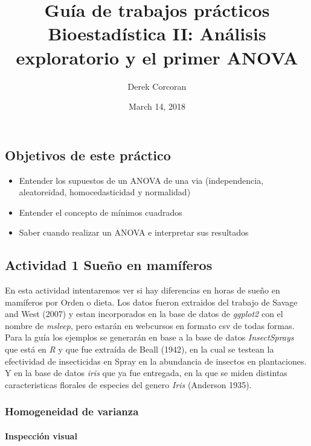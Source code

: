 \documentclass[]{article}
\title{Guía de trabajos prácticos Bioestadística II: Análisis exploratorio y el
primer ANOVA}
\author{Derek Corcoran}
\date{March 14, 2018}
\providecommand{\tightlist}{%
  \setlength{\itemsep}{0pt}\setlength{\parskip}{0pt}}
\let\oldparagraph\paragraph
\renewcommand{\paragraph}[1]{\oldparagraph{#1}\mbox{}}
\begin{document}
\maketitle

{
\setcounter{tocdepth}{2}
\tableofcontents
}
\subsection{Objetivos de este
práctico}\label{objetivos-de-este-practico}

\begin{itemize}
\tightlist
\item
  Entender los supuestos de un ANOVA de una via (independencia,
  aleatoreidad, homocedasticidad y normalidad)
\item
  Entender el concepto de mínimos cuadrados
\item
  Saber cuando realizar un ANOVA e interpretar sus resultados
\end{itemize}

\subsection{Actividad 1 Sueño en
mamíferos}\label{actividad-1-sueno-en-mamiferos}

En esta actividad intentaremos ver si hay diferencias en horas de sueño
en mamíferos por Orden o dieta. Los datos fueron extraidos del trabajo
de Savage and West (2007) y estan incorporados en la base de datos de
\emph{ggplot2} con el nombre de \emph{msleep}, pero estarán en webcursos
en formato csv de todas formas. Para la guía los ejemplos se generarán
en base a la base de datos \emph{InsectSprays} que está en \emph{R} y
que fue extraída de Beall (1942), en la cual se testean la efectividad
de insecticidas en Spray en la abundancia de insectos en plantaciones. Y
en la base de datos \emph{iris} que ya fue entregada, en la que se miden
distintas caracteristicas florales de especies del genero \emph{Iris}
(Anderson 1935).

\subsubsection{Homogeneidad de varianza}\label{homogeneidad-de-varianza}

\paragraph{Inspección visual}\label{inspeccion-visual}
\end{document}
